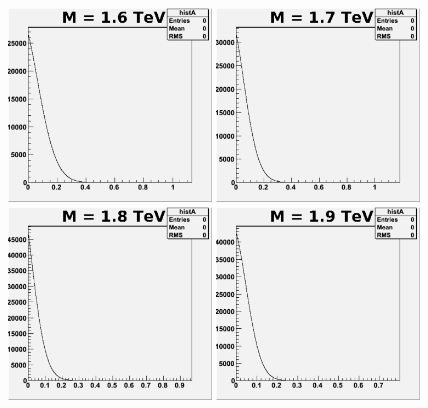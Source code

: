 \begin{figure}[!ht]
  \begin{center}
     \includegraphics[width=0.48\textwidth]{Figures/MCpost1600_6_pe0.pdf}
     \includegraphics[width=0.48\textwidth]{Figures/MCpost1700_6_pe0.pdf}
     \includegraphics[width=0.48\textwidth]{Figures/MCpost1800_6_pe0.pdf}
     \includegraphics[width=0.48\textwidth]{Figures/MCpost1900_6_pe0.pdf}

\end{center}
\end{figure}
